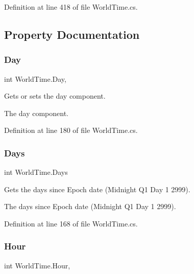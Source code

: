 Definition at line 418 of file World\+Time.\+cs.



\subsection{Property Documentation}
\mbox{\label{struct_world_time_a68b3e2fb2b048f6fdb3662f4434fb833}} 
\subsubsection{\texorpdfstring{Day}{Day}}
{\footnotesize\ttfamily int World\+Time.\+Day\hspace{0.3cm}{\ttfamily [get]}, {\ttfamily [set]}}



Gets or sets the day component. 

The day component.

Definition at line 180 of file World\+Time.\+cs.

\mbox{\label{struct_world_time_a379145f430beff5a39c3d322a492e342}} 
\subsubsection{\texorpdfstring{Days}{Days}}
{\footnotesize\ttfamily int World\+Time.\+Days\hspace{0.3cm}{\ttfamily [get]}}



Gets the days since Epoch date (Midnight Q1 Day 1 2999). 

The days since Epoch date (Midnight Q1 Day 1 2999).

Definition at line 168 of file World\+Time.\+cs.

\mbox{\label{struct_world_time_a02d7b7493d1f177421c5fba0d81b9be8}} 
\subsubsection{\texorpdfstring{Hour}{Hour}}
{\footnotesize\ttfamily int World\+Time.\+Hour\hspace{0.3cm}{\ttfamily [get]}, {\ttfamily [set]}}



